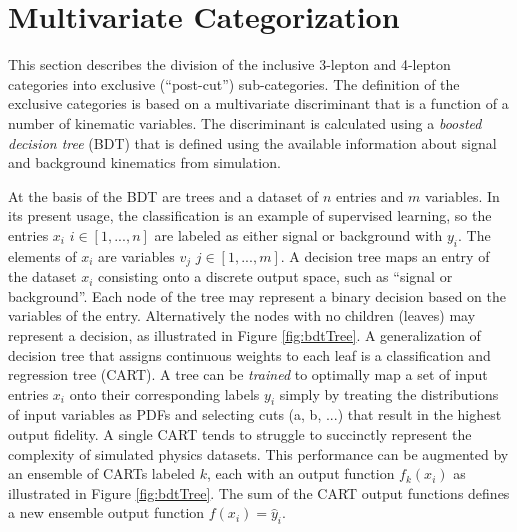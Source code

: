 \section{Multivariate Categorization}\label{sec:hmmBdt}

This section describes the division of the inclusive 3-lepton and 4-lepton categories into exclusive (``post-cut'') sub-categories.
The definition of the exclusive categories is based on a multivariate discriminant that is a function of a number of kinematic variables.
The discriminant is calculated using a \emph{boosted decision tree} (BDT) that is defined using the available information about signal and background kinematics from simulation.


At the basis of the BDT are trees and a dataset of $n$ entries and $m$ variables.
In its present usage, the classification is an example of supervised learning, so the entries $x_i$ $i\in[1,...,n]$ are labeled as either signal or background with $y_i$.
The elements of $x_i$ are variables $v_j$ $j\in[1,...,m]$.
A decision tree maps an entry of the dataset $x_i$ consisting onto a discrete output space, such as ``signal or background''.
Each node of the tree may represent a binary decision based on the variables of the entry.
Alternatively the nodes with no children (leaves) may represent a decision, as illustrated in Figure \ref{fig:bdtTree}.
A generalization of decision tree that assigns continuous weights to each leaf is a classification and regression tree (CART).
A tree can be \emph{trained} to optimally map a set of input entries $x_i$ onto their corresponding labels $y_i$ simply by treating the distributions of input variables as PDFs and selecting cuts (a, b, ...) that result in the highest output fidelity.
A single CART tends to struggle to succinctly represent the complexity of simulated physics datasets.
This performance can be augmented by an ensemble of CARTs labeled $k$, each with an output function $f_k(x_i)$ as illustrated in Figure \ref{fig:bdtTree}.
The sum of the CART output functions defines a new ensemble output function $f(x_i)=\hat{y}_i$.

